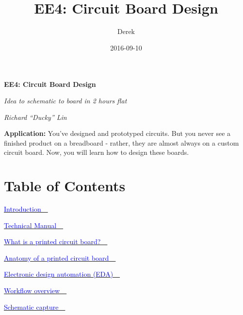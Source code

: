 \documentclass[letterpaper]{article}
\title{EE4: Circuit Board Design}
\author{Derek}
\date{2016-09-10}
\newcommand\textstyleSubtleEmphasis[1]{\textit{\textcolor[rgb]{0.5019608,0.5019608,0.5019608}{#1}}}
\begin{document}
\clearpage\setcounter{page}{1}\pagestyle{Standard}
{\centering{}\sffamily\bfseries\color[rgb]{0.30980393,0.5058824,0.7411765}
EE4: Circuit Board Design
\par}

{\centering{}\itshape\color[rgb]{0.30980393,0.5058824,0.7411765}
Idea to schematic to board in 2 hours flat
\par}

{\centering{}\itshape\color[rgb]{0.30980393,0.5058824,0.7411765}
\textstyleSubtleEmphasis{\textup{Richard ``Ducky'' Lin}}
\par}


\bigskip

{\sffamily\color[rgb]{0.30980393,0.5058824,0.7411765}
\textbf{Application:} You've designed and prototyped circuits. But you never see a finished product on a breadboard -
rather, they are almost always on a custom circuit board. Now, you will learn how to design these boards.}

\section{Table of Contents}
{\sffamily\color[rgb]{0.30980393,0.5058824,0.7411765}
\hyperlink{Toc337742671}{\textcolor{blue}{Introduction\ \ }}}

{\sffamily\color[rgb]{0.30980393,0.5058824,0.7411765}
\hyperlink{Toc337742672}{\textcolor{blue}{Technical Manual\ \ }}}

{\sffamily\color[rgb]{0.30980393,0.5058824,0.7411765}
\hyperlink{Toc337742673}{\textcolor{blue}{What is a printed circuit board?\ \ }}}

{\sffamily\color[rgb]{0.30980393,0.5058824,0.7411765}
\hyperlink{Toc337742674}{\textcolor{blue}{Anatomy of a printed circuit board\ \ }}}

{\sffamily\color[rgb]{0.30980393,0.5058824,0.7411765}
\hyperlink{Toc337742675}{\textcolor{blue}{Electronic design automation (EDA)\ \ }}}

{\sffamily\color[rgb]{0.30980393,0.5058824,0.7411765}
\hyperlink{Toc337742676}{\textcolor{blue}{Workflow overview\ \ }}}

{\sffamily\color[rgb]{0.30980393,0.5058824,0.7411765}
\hyperlink{Toc337742677}{\textcolor{blue}{Schematic capture\ \ }}}
\end{document}
